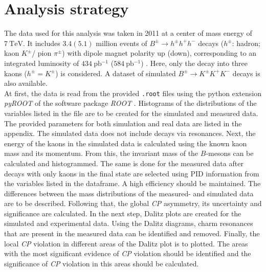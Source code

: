 \section{Analysis strategy}
\label{sec:Analysis_strategy}
The data used for this analysis was taken in 2011 at a center of mass energy of $\qty{7}{\tera\eV}$. It includes $\num{3.4}(\num{5.1})$ million events of 
$B^{\pm} \to h^{\pm} h^+ h^-$ decays ($h^{\pm}$: hadron; kaon $K^{\pm}$/ pion {$\pi^{\pm}$}) with dipole magnet polarity up (down), 
corresponding to an integrated luminosity of $\qty{434}{\pico\barn^{-1}}$ ($\qty{584}{\pico\barn^{-1}}$) \cite{LHCb_CPV}. 
Here, only the decay into three kaons ($h^{\pm} =  K^{\pm}$) is considered.
A dataset of simulated $B^{\pm} \to K^{\pm} K^+ K^-$ decays is also available. \\
At first, the data is read from the provided \texttt{.root} files using the python extension \textit{pyROOT} of the software package \textit{ROOT} \cite{ROOT}.
Histograms of the distributions of the variables listed in the file are to be created for the simulated and measured data. The provided parameters for both simulation
and real data are listed in the appendix. The simulated data does not include decays via resonances.
Next, the energy of the kaons in the simulated data is calculated using the known kaon mass and its momentum. From this, the invariant mass of the $B$-mesons can be calculated 
and histogrammed. 
The same is done for the measured data after decays with only kaons in the final state are selected using PID information from the variables listed in the dataframe. 
A high efficiency should be maintained. The differences between the mass distributions of the measured- and simulated data are to be described.
Following that, the global \textit{CP} asymmetry, its uncertainty and significance are calculated.
In the next step, Dalitz plots are created for the simulated and experimental data. Using the Dalitz diagrams, charm resonances that are present in the measured data can be 
identified and removed. Finally, the local \textit{CP} violation in different areas of the Dalitz plot is to plotted. The areas with the most significant evidence of \textit{CP} violation 
should be identified and the significance of \textit{CP} violation in this areas should be calculated. 
